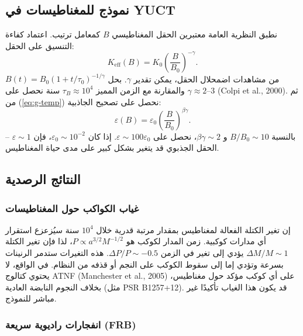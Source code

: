 \documentclass[11pt,a4paper]{article}
\newcommand{\Keff}{K_{\mathrm{eff}}}
\newcommand{\eps}{\varepsilon}
\begin{document}
	\subsection{نموذج للمغناطيسات في YUCT}
	\label{subsec:magnetars-model}
	
	نطبق النظرية العامة معتبرين الحقل المغناطيسي $B$ كمعامل ترتيب. اعتماد كفاءة التنسيق على الحقل:
	\begin{equation}
		\Keff(B) = K_0 \left( \frac{B}{B_0} \right)^{-\gamma}.
		\label{eq:keff-b}
	\end{equation}
	من مشاهدات اضمحلال الحقل، يمكن تقدير $\gamma$. بحل $B(t) = B_0 (1 + t/\tau_0)^{-1/\gamma}$ والمقارنة مع الزمن المميز $\tau_B \approx 10^4$ سنة نحصل على $\gamma \approx 2$–$3$ (Colpi et al., 2000). ثم من (\ref{eq:g-temp}) نحصل على تصحيح الجاذبية:
	\begin{equation}
		\eps(B) = \eps_0 \left( \frac{B}{B_0} \right)^{\beta\gamma}.
		\label{eq:eps-b}
	\end{equation}
	بالنسبة $B/B_0 \sim 10$ و $\beta\gamma \sim 2$، نحصل على $\eps \sim 100 \eps_0$. إذا كان $\eps_0 \sim 10^{-2}$، فإن $\eps \sim 1$ – الحقل الجذبوي قد يتغير بشكل كبير على مدى حياة المغناطيس.
	
	\subsection{النتائج الرصدية}
	\label{subsec:magnetars-consequences}
	
	\subsubsection{غياب الكواكب حول المغناطيسات}
	\label{subsubsec:magnetars-planets}
	
	إن تغير الكتلة الفعالة لمغناطيس بمقدار مرتبة قدرية خلال $10^4$ سنة سيُزعزع استقرار أي مدارات كوكبية. زمن المدار لكوكب هو $P \propto a^{3/2} M^{-1/2}$، لذا فإن تغير الكتلة $\Delta M/M \sim 1$ يؤدي إلى تغير في الزمن $\Delta P/P \sim -0.5$. هذه التغيرات ستدمر الرنينات بسرعة وتؤدي إما إلى سقوط الكوكب على النجم أو قذفه من النظام. في الواقع، لا يحتوي كتالوج ATNF (Manchester et al., 2005) على أي كوكب مؤكد حول مغناطيس، بخلاف النجوم النابضة العادية (مثل PSR B1257+12). قد يكون هذا الغياب تأكيدًا غير مباشر للنموذج.
	
	\subsubsection{انفجارات راديوية سريعة (FRB)}\label{subsec:magnetars-frb}
	
\end{document}
